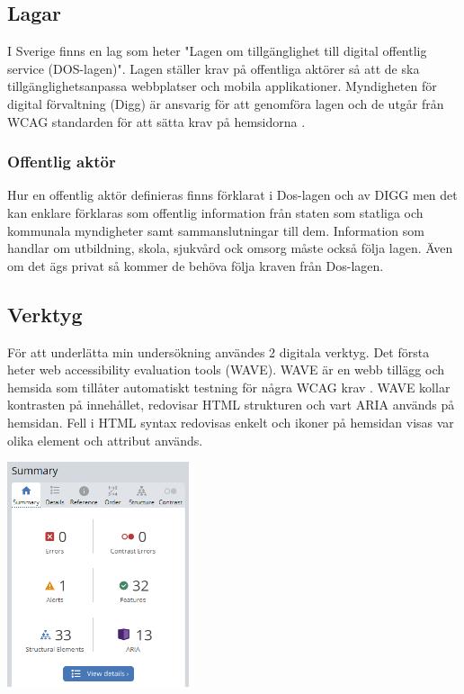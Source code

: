\documentclass[11p]{article}
\begin{document}
    \subsection{Lagar}
    I Sverige finns en lag som heter "Lagen om tillgänglighet till digital offentlig service (DOS-lagen)"\parencite{Dos-lagen}.
    Lagen ställer krav på offentliga aktörer så att de ska tillgänglighetsanpassa webbplatser och mobila applikationer.
    Myndigheten för digital förvaltning (Digg) är ansvarig för att genomföra lagen och de utgår från WCAG standarden för att sätta krav på hemsidorna \parencite{Utförande_av_Dos_lagen}.

    \subsubsection{Offentlig aktör}
    Hur en offentlig aktör definieras finns förklarat i Dos-lagen \parencite{Dos-lagen} och av DIGG \parencite{Om_Dos-lage} men det kan enklare förklaras som offentlig information från staten som statliga och kommunala myndigheter samt sammanslutningar till dem.
    Information som handlar om utbildning, skola, sjukvård ock omsorg måste också följa lagen.
    Även om det ägs privat så kommer de behöva följa kraven från Dos-lagen.

    \subsection{Verktyg}
    För att underlätta min undersökning användes 2 digitala verktyg.
    Det första heter web accessibility evaluation tools (WAVE).
    WAVE är en webb tillägg och hemsida som tillåter automatiskt testning för några WCAG krav \parencite{WAVE}.
    WAVE kollar kontrasten på innehållet, redovisar HTML strukturen och vart ARIA används på hemsidan.
    Fell i HTML syntax redovisas enkelt och ikoner på hemsidan visas var olika element och attribut används.

    \includegraphics[width=0.4\textwidth]{../images/WAVE.png}
\end{document}
